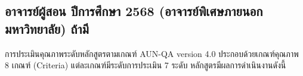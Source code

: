 \subsection*{อาจารย์ผู้สอน ปีการศึกษา 2568 (อาจารย์พิเศษภายนอกมหาวิทยาลัย) ถ้ามี}

\par

\clearpage
{}

การประเมินคุณภาพระดับหลักสูตรตามเกณฑ์ AUN-QA version 4.0 ประกอบด้วยเกณฑ์คุณภาพ 8 เกณฑ์ (Criteria)
แต่ละเกณฑ์มีระดับการประเมิน 7 ระดับ หลักสูตรมีผลการดำเนินงานดังนี้
